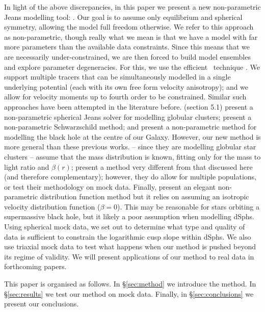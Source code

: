 In light of the above discrepancies, in this paper we present a new
non-parametric Jeans modelling tool: \GravLite. Our goal is to assume only
equilibrium and spherical symmetry, allowing the model full freedom
otherwise. We refer to this approach as non-parametric, though really what we
mean is that we have a model with far more parameters than the available data
constraints. Since this means that we are necessarily under-constrained, we are
then forced to build model ensembles and explore parameter degeneracies. For
this, we use the efficient \MultiNest\ technique \citep{Feroz+2009}. We support
multiple tracers that can be simultaneously modelled in a single underlying
potential (each with its own free form velocity anisotropy); and we allow for
velocity moments up to fourth order to be constrained. Similar such approaches
have been attempted in the literature before. \citet{2011ApJ...738..186I}
(section 5.1) present a non-parametric spherical Jeans solver for modelling
globular clusters; \citet{JardelGebhardt2013} present a non-parametric
Schwarzschild method; and \citet{2001AJ....122..232C} present a non-parametric
method for modelling the black hole at the centre of our Galaxy. However, our
new method is more general than these previous
works. \citet{2011ApJ...738..186I} -- since they are modelling globular star
clusters -- assume that the mass distribution is known, fitting only for the
mass to light ratio and $\beta(r)$; \citet{JardelGebhardt2013} present a method
very different from that discussed here (and therefore complementary); however,
they do allow for multiple populations, or test their methodology on mock
data. Finally, \citet{2001AJ....122..232C} present an elegant non-parametric
distribution function method but it relies on assuming an isotropic velocity
distribution function ($\beta = 0$). This may be reasonable for stars orbiting a
supermassive black hole, but it likely a poor assumption when modelling
dSphs. Using spherical mock data, we set out to determine what type and quality
of data is sufficient to constrain the logarithmic cusp slope within dSphs. We
also use triaxial mock data to test what happens when our method is pushed
beyond its regime of validity. We will present applications of our method to
real data in forthcoming papers.

This paper is organised as follows. In \S\ref{sec:method} we introduce
the method. In \S\ref{sec:results} we test our method on
mock data. Finally, in \S\ref{sec:conclusions} we present our conclusions.

